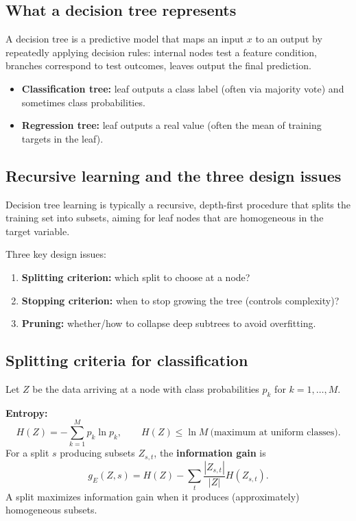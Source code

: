 \documentclass[11pt, oneside]{book}
\newcommand{\1}{\ind}                       %
\begin{document}
\subsection{What a decision tree represents}
A decision tree is a predictive model that maps an input $x$ to an output by repeatedly applying decision rules:
internal nodes test a feature condition, branches correspond to test outcomes, leaves output the final prediction.

\begin{itemize}
  \item \textbf{Classification tree:} leaf outputs a class label (often via majority vote) and sometimes class probabilities.
  \item \textbf{Regression tree:} leaf outputs a real value (often the mean of training targets in the leaf).
\end{itemize}

\subsection{Recursive learning and the three design issues}
Decision tree learning is typically a recursive, depth-first procedure that splits the training set into subsets, aiming for leaf nodes that are homogeneous in the target variable.

Three key design issues:
\begin{enumerate}
  \item \textbf{Splitting criterion:} which split to choose at a node?
  \item \textbf{Stopping criterion:} when to stop growing the tree (controls complexity)?
  \item \textbf{Pruning:} whether/how to collapse deep subtrees to avoid overfitting.
\end{enumerate}

\subsection{Splitting criteria for classification}
Let $Z$ be the data arriving at a node with class probabilities $p_k$ for $k=1,\dots,M$.

\textbf{Entropy:}
\[
  H(Z) = -\sum_{k=1}^{M} p_k \ln p_k,
\qquad
H(Z)\le \ln M \ \text{(maximum at uniform classes)}.
\]
For a split $s$ producing subsets $Z_{s,t}$, the \textbf{information gain} is
\[
  g_E(Z,s)=H(Z)-\sum_t \frac{|Z_{s,t}|}{|Z|}H(Z_{s,t}).
\]
A split maximizes information gain when it produces (approximately) homogeneous subsets.
\end{document}
